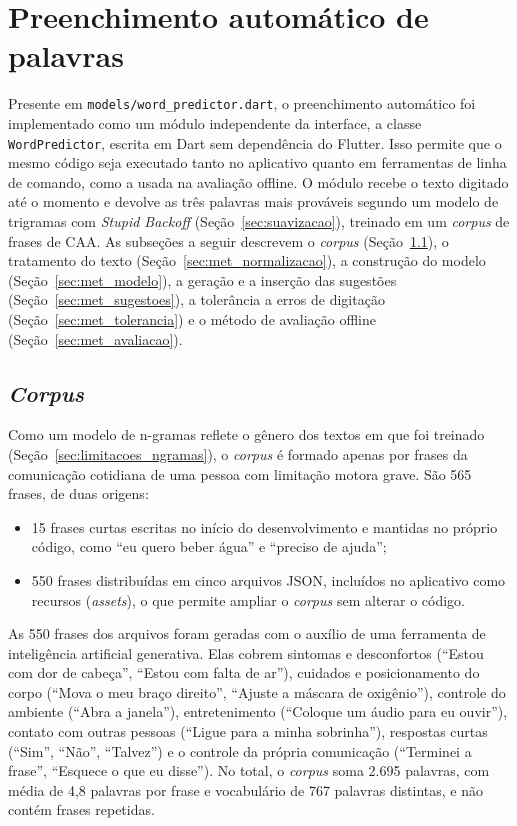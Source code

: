 \section{Preenchimento automático de palavras} \label{sec:met_preenchimento}
Presente em \texttt{models/word\_predictor.dart}, o preenchimento automático foi implementado como um módulo independente da interface, a classe \texttt{WordPredictor}, escrita em Dart sem dependência do Flutter. Isso permite que o mesmo código seja executado tanto no aplicativo quanto em ferramentas de linha de comando, como a usada na avaliação offline. O módulo recebe o texto digitado até o momento e devolve as três palavras mais prováveis segundo um modelo de trigramas com \textit{Stupid Backoff} (Seção~\ref{sec:suavizacao}), treinado em um \textit{corpus} de frases de \gls{CAA}. As subseções a seguir descrevem o \textit{corpus} (Seção~\ref{sec:met_corpus}), o tratamento do texto (Seção~\ref{sec:met_normalizacao}), a construção do modelo (Seção~\ref{sec:met_modelo}), a geração e a inserção das sugestões (Seção~\ref{sec:met_sugestoes}), a tolerância a erros de digitação (Seção~\ref{sec:met_tolerancia}) e o método de avaliação offline (Seção~\ref{sec:met_avaliacao}).

\subsection{\textit{Corpus}} \label{sec:met_corpus}

Como um modelo de n-gramas reflete o gênero dos textos em que foi treinado (Seção~\ref{sec:limitacoes_ngramas}), o \textit{corpus} é formado apenas por frases da comunicação cotidiana de uma pessoa com limitação motora grave. São 565 frases, de duas origens:
\begin{itemize}
    \item 15 frases curtas escritas no início do desenvolvimento e mantidas no próprio código, como ``eu quero beber água'' e ``preciso de ajuda'';
    \item 550 frases distribuídas em cinco arquivos JSON, incluídos no aplicativo como recursos (\textit{assets}), o que permite ampliar o \textit{corpus} sem alterar o código.
\end{itemize}

As 550 frases dos arquivos foram geradas com o auxílio de uma ferramenta de inteligência artificial generativa. %
Elas cobrem sintomas e desconfortos (``Estou com dor de cabeça'', ``Estou com falta de ar''), cuidados e posicionamento do corpo (``Mova o meu braço direito'', ``Ajuste a máscara de oxigênio''), controle do ambiente (``Abra a janela''), entretenimento (``Coloque um áudio para eu ouvir''), contato com outras pessoas (``Ligue para a minha sobrinha''), respostas curtas (``Sim'', ``Não'', ``Talvez'') e o controle da própria comunicação (``Terminei a frase'', ``Esquece o que eu disse''). No total, o \textit{corpus} soma 2.695 palavras, com média de 4,8 palavras por frase e vocabulário de 767 palavras distintas, e não contém frases repetidas.

